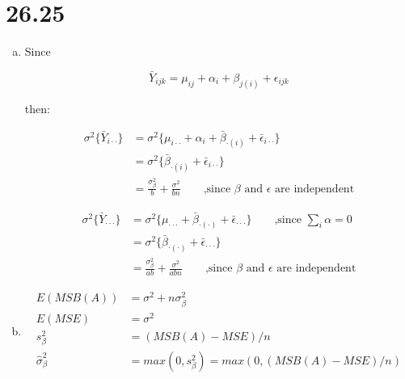 \documentclass{article}\usepackage[]{graphicx}\usepackage[]{color}
\begin{document}
\section{26.25}

\begin{enumerate}[(a)]

\item

Since

$$\bar{Y}_{ijk} = \mu_{ij} + \alpha_i + \beta_{j (i)} + \epsilon_{ijk}$$

then:

\begin{displaymath}
\begin{split}
\sigma^2 \{ \bar{Y}_{i\cdot\cdot} \} &= \sigma^2 \{ \mu_{i\cdot\cdot} + \alpha_i + \bar{\beta}_{\cdot (i)} + \bar{\epsilon}_{i\cdot\cdot} \} \\
                        &= \sigma^2 \{ \bar{\beta}_{\cdot (i)} + \bar{\epsilon}_{i\cdot\cdot} \} \\
                        &= \frac{\sigma^2_{\beta}}{b} + \frac{\sigma^2}{bn}  \qquad \text{,since $\beta$ and $\epsilon$ are independent}
\end{split}
\end{displaymath}

\begin{displaymath}
\begin{split}
\sigma^2 \{ \bar{Y}_{\cdot\cdot\cdot} \} &= \sigma^2 \{ \mu_{\cdot\cdot\cdot}  + \bar{\beta}_{\cdot (\cdot)} + \bar{\epsilon}_{\cdot\cdot\cdot} \} \qquad \text{,since $\sum_i \alpha=0$}\\
                        &= \sigma^2 \{ \bar{\beta}_{\cdot (\cdot)} + \bar{\epsilon}_{\cdot\cdot\cdot} \} \\
                        &= \frac{\sigma^2_{\beta}}{ab} + \frac{\sigma^2}{abn}  \qquad \text{,since $\beta$ and $\epsilon$ are independent}
\end{split}
\end{displaymath}

\item

\begin{displaymath}
\begin{split}
E(MSB(A)) &= \sigma^2 + n\sigma^2_{\beta}\\
E(MSE) &= \sigma^2 \\
s^2_\beta &= (MSB(A)-MSE)/n\\
\hat{\sigma}_\beta^2 &= max(0, s^2_\beta) = max(0, (MSB(A)-MSE)/n)
\end{split}
\end{displaymath}

\end{enumerate}
\end{document}
